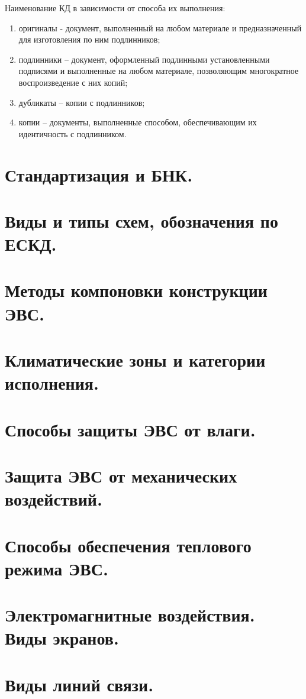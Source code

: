 \documentclass[unicode, 12pt, a4paper, oneside]{article}
\begin{document}
Наименование КД в зависимости от способа их выполнения:
\begin{enumerate}
\item оригиналы - документ,  выполненный на  любом материале и предназначенный для изготовления по ним подлинников;
\item подлинники – документ, оформленный подлинными установленными подписями и выполненные на любом материале, позволяющим многократное воспроизведение с них копий;
\item дубликаты – копии с подлинников; 
\item копии – документы, выполненные способом, обеспечивающим их идентичность с подлинником.
\end{enumerate}

\section{Стандартизация и БНК.}
\section{Виды и типы схем, обозначения по ЕСКД.}
\section{Методы компоновки конструкции ЭВС.}
\section{Климатические зоны и категории исполнения.}
\section{Способы защиты ЭВС от влаги.}
\section{Защита ЭВС от механических воздействий.}
\section{Способы обеспечения теплового режима ЭВС.}
\section{Электромагнитные воздействия. Виды экранов.}
\section{Виды линий связи.}
\end{document}
